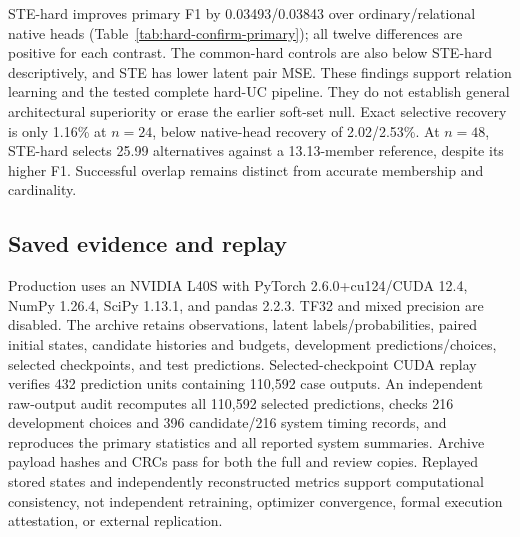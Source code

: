 \begin{table}[ht]\centering\scriptsize

\caption{All six independently timed systems. All-class F1 uses the natural mixture; remaining metrics use selective non-singleton cores. Exact is complete-set recovery (\%). Pair MSE uses latent simulated truth unavailable to the predictor. Means average graphs, initializations, and twelve collections. $n=48$ and the common-hard controls are descriptive.}\label{tab:hard-confirm-systems}
\end{table}

STE-hard improves primary F1 by 0.03493/0.03843 over ordinary/relational native heads (Table~\ref{tab:hard-confirm-primary}); all twelve differences are positive for each contrast. The common-hard controls are also below STE-hard descriptively, and STE has lower latent pair MSE. These findings support relation learning and the tested complete hard-UC pipeline. They do not establish general architectural superiority or erase the earlier soft-set null. Exact selective recovery is only 1.16\% at $n=24$, below native-head recovery of 2.02/2.53\%. At $n=48$, STE-hard selects 25.99 alternatives against a 13.13-member reference, despite its higher F1. Successful overlap remains distinct from accurate membership and cardinality.

\subsection{Saved evidence and replay}
Production uses an NVIDIA L40S with PyTorch 2.6.0+cu124/CUDA 12.4, NumPy 1.26.4, SciPy 1.13.1, and pandas 2.2.3. TF32 and mixed precision are disabled. The archive retains observations, latent labels/probabilities, paired initial states, candidate histories and budgets, development predictions/choices, selected checkpoints, and test predictions. Selected-checkpoint CUDA replay verifies 432 prediction units containing 110,592 case outputs. An independent raw-output audit recomputes all 110,592 selected predictions, checks 216 development choices and 396 candidate/216 system timing records, and reproduces the primary statistics and all reported system summaries. Archive payload hashes and CRCs pass for both the full and review copies. Replayed stored states and independently reconstructed metrics support computational consistency, not independent retraining, optimizer convergence, formal execution attestation, or external replication.
